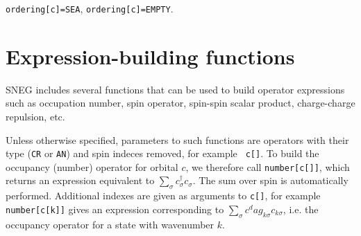 \documentclass[a4paper,10pt,openany]{book}
\begin{document}
{\tt ordering[c]=SEA}, {\tt ordering[c]=EMPTY}.

\section{Expression-building functions}

SNEG includes several functions that can be used to build operator
expressions such as occupation number, spin operator, spin-spin scalar
product, charge-charge repulsion, etc.

Unless otherwise specified, parameters to such functions are operators with
their type ({\tt CR} or {\tt AN}) and spin indeces removed, for example {\tt
c[]}. To build the occupancy (number) operator for orbital $c$, we therefore
call {\tt number[c[]]}, which returns an expression equivalent to
$\sum_\sigma c^\dag_\sigma c_\sigma$. The sum over spin is automatically
performed. Additional indexes are given as arguments to {\tt c[]}, for
example {\tt number[c[k]]} gives an expression corresponding to $\sum_\sigma
c^dag_{k\sigma} c_{k\sigma}$, i.e. the occupancy operator for a state with
wavenumber $k$.
\end{document}
